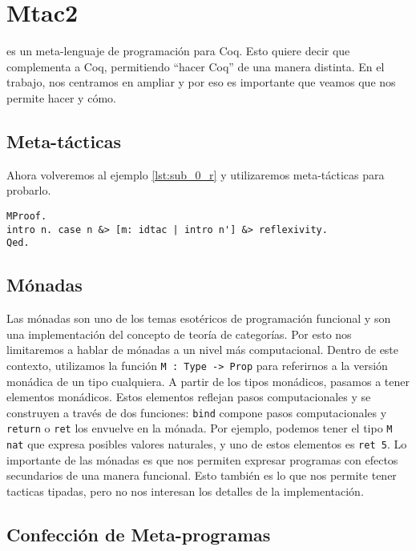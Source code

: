 \chapter{Mtac2}\label{ch:mtac2}

\Mtac \cite{DBLP:journals/pacmpl/KaiserZKRD18} es un meta-lenguaje de programación para Coq. Esto quiere decir que complementa a Coq, permitiendo ``hacer Coq'' de una manera distinta. En el trabajo, nos centramos en ampliar \Mtac y por eso es importante que veamos que nos permite hacer y cómo.

\section{Meta-tácticas}

Ahora volveremos al ejemplo \ref{lst:sub_0_r} y utilizaremos meta-tácticas para probarlo.
\begin{lstlisting}[frame=tb,caption={Prueba en \Mtac},label=lst:sub_0_r_mtac2]
MProof.
intro n. case n &> [m: idtac | intro n'] &> reflexivity.
Qed.
\end{lstlisting}

\section{Mónadas}
Las mónadas son uno de los temas esotéricos de programación funcional y son una implementación del concepto de teoría de categorías.
Por esto nos limitaremos a hablar de mónadas a un nivel más computacional. Dentro de este contexto, utilizamos la función \lstinline{M : Type -> Prop} para referirnos a la versión monádica de un tipo cualquiera. A partir de los tipos monádicos, pasamos a tener elementos monádicos. Estos elementos reflejan pasos computacionales y se construyen a través de dos funciones: \lstinline{bind} compone pasos computacionales y \lstinline{return} o \lstinline{ret} los envuelve en la mónada. Por ejemplo, podemos tener el tipo \lstinline{M nat} que expresa posibles valores naturales, y uno de estos elementos es \lstinline{ret 5}. Lo importante de las mónadas es que nos permiten expresar programas con efectos secundarios de una manera funcional.
Esto también es lo que nos permite tener tacticas tipadas, pero no nos interesan los detalles de la implementación.

\section{Confección de Meta-programas}

